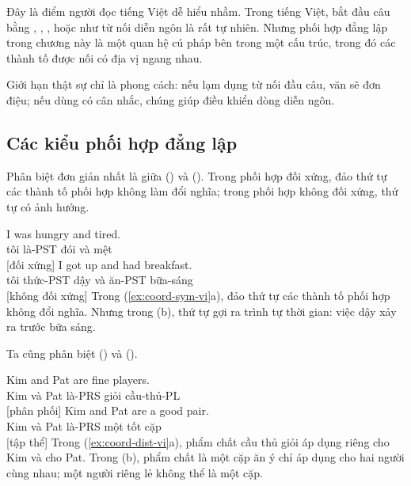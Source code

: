 Đây là điểm người đọc tiếng Việt dễ hiểu nhầm. Trong tiếng Việt, bắt đầu câu bằng , , , hoặc  như từ nối diễn ngôn là rất tự nhiên. Nhưng phối hợp đẳng lập trong chương này là một quan hệ cú pháp bên trong một cấu trúc, trong đó các thành tố được nối có địa vị ngang nhau.

Giới hạn thật sự chỉ là phong cách: nếu lạm dụng từ nối đầu câu, văn sẽ đơn điệu; nếu dùng có cân nhắc, chúng giúp điều khiển dòng diễn ngôn.

\subsection{Các kiểu phối hợp đẳng lập}

Phân biệt đơn giản nhất là giữa  () và  (). Trong phối hợp đối xứng, đảo thứ tự các thành tố phối hợp không làm đổi nghĩa; trong phối hợp không đối xứng, thứ tự có ảnh hưởng.

\ea \label{ex:coord-sym-vi}
    \ea \gll I was hungry and tired.\\
        tôi là-PST đói và mệt\\
    \glt {} [đối xứng]
    \ex \gll I got up and had breakfast.\\
        tôi thức-PST dậy và ăn-PST bữa-sáng\\
    \glt {} [không đối xứng]
    \z
\z
Trong (\ref{ex:coord-sym-vi}a), đảo thứ tự các thành tố phối hợp không đổi nghĩa. Nhưng trong (b), thứ tự gợi ra trình tự thời gian: việc dậy xảy ra trước bữa sáng.

Ta cũng phân biệt  () và  ().

\ea \label{ex:coord-dist-vi}
    \ea \gll Kim and Pat are fine players.\\
        Kim và Pat là-PRS giỏi cầu-thủ-PL\\
    \glt {} [phân phối]
    \ex \gll Kim and Pat are a good pair.\\
        Kim và Pat là-PRS một tốt cặp\\
    \glt {} [tập thể]
    \z
\z
Trong (\ref{ex:coord-dist-vi}a), phẩm chất cầu thủ giỏi áp dụng riêng cho Kim và cho Pat. Trong (b), phẩm chất là một cặp ăn ý chỉ áp dụng cho hai người cùng nhau; một người riêng lẻ không thể là một cặp.


